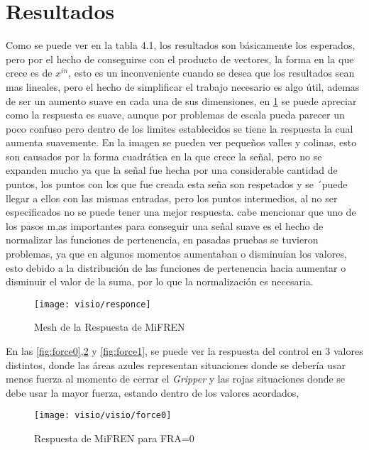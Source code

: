 \section{Resultados}
Como se puede ver en la tabla 4.1, los resultados son básicamente los esperados,  pero por el hecho de conseguirse con el producto de vectores, la forma en la que crece es de $x^{in}$, esto es un inconveniente cuando se desea que los resultados sean mas lineales, pero el hecho de simplificar el trabajo necesario es algo útil, ademas de ser un aumento suave en cada una de sus dimensiones, en \cref{fig:responce} se puede apreciar como la respuesta es suave, aunque por problemas de escala pueda parecer un poco confuso pero dentro de los limites establecidos se tiene la respuesta la cual aumenta suavemente.
En la imagen se pueden ver pequeños valles y colinas, esto son causados por la forma cuadrática en la que crece la señal, pero no se expanden mucho ya que la señal fue hecha por una considerable cantidad de puntos, los puntos con los que fue creada esta seña son respetados y se ´puede llegar a ellos con  las mismas entradas, pero los puntos intermedios, al no ser especificados no se puede tener una mejor respuesta.
cabe mencionar que uno de los pasos m,as importantes para conseguir una señal suave es el hecho de normalizar las funciones de pertenencia, en pasadas pruebas se tuvieron problemas, ya que en algunos momentos aumentaban o disminuían los valores, esto debido a la distribución de las funciones de pertenencia hacia aumentar o disminuir el valor de la suma, por lo que la normalización es necesaria.

\begin{figure}[h]
	\centering
	\texttt{[image: visio/responce]}
	\caption{Mesh de la Respuesta de MiFREN}
	\label{fig:responce}
\end{figure}




En las \cref{fig:force0},\cref{fig:force05} y \cref{fig:force1}, se puede ver la respuesta del control en 3 valores distintos, donde las áreas azules representan situaciones donde se debería usar menos fuerza al momento de cerrar el \textit{Gripper} y las rojas situaciones donde se debe usar la mayor fuerza, estando dentro de los valores acordados,





\begin{figure}[h]
	\centering
	\texttt{[image: visio/visio/force0]}
	\caption{Respuesta de MiFREN para FRA=0}
	\label{fig:force05}
\end{figure}


